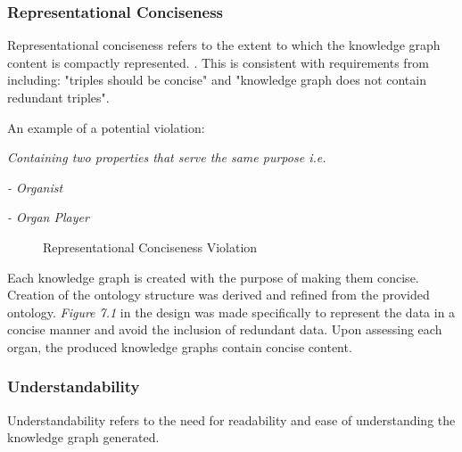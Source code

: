 \subsubsection{Representational Conciseness}
\hspace{0.5cm} Representational conciseness refers to the extent to which the knowledge graph content is compactly represented. \cite{knowledgegraphevaulationbook}. This is consistent with requirements from \cite{evaluationpaper} including: "triples should be concise" and "knowledge graph does not contain redundant triples".

\noindent An example of a potential violation: 
\vspace{-0.1cm}
\begin{displayquote}
    \textit{Containing two properties that serve the same purpose i.e.}
\end{displayquote}
\vspace{-0.5cm}
\begin{displayquote}
    \textit{- Organist}
\end{displayquote}
\vspace{-0.6cm}
\begin{displayquote}
    \textit{- Organ Player}
\end{displayquote}

\begin{figure}[H]
\begin{center}
\end{center}
\vspace{-0.5cm}
\caption{Representational Conciseness Violation}
\end{figure}

Each knowledge graph is created with the purpose of making them concise. Creation of the ontology structure was derived and refined from the provided ontology. \textit{Figure 7.1} in the design was made specifically to represent the data in a concise manner and avoid the inclusion of redundant data. Upon assessing each organ, the produced knowledge graphs contain concise content.

\subsubsection{Understandability}
\hspace{0.5cm} Understandability refers to the need for readability and ease of understanding the knowledge graph generated. \cite{knowledgegraphevaulationbook}

